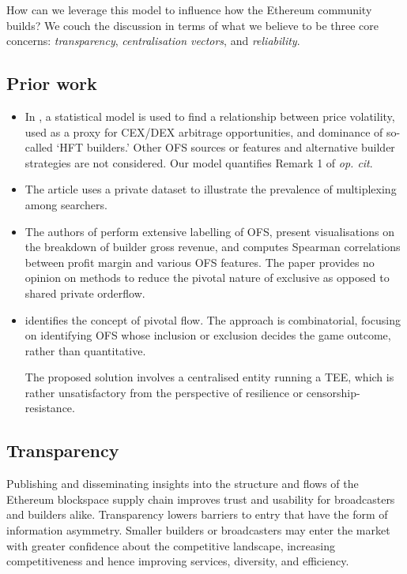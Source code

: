 How can we leverage this model to influence how the Ethereum community builds?
%
We couch the discussion in terms of what we believe to be three core concerns: \emph{transparency}, \emph{centralisation vectors}, and \emph{reliability}.

\subsection*{Prior work}

\begin{itemize}
\item 
  In \cite{gupta2023centralizing}, a statistical model is used to find a relationship between price volatility, used as a proxy for CEX/DEX arbitrage opportunities, and dominance of so-called `HFT builders.'
  Other OFS sources or features and alternative builder strategies are not considered.
  Our model quantifies Remark 1 of \emph{op. cit}.

\item
  The article \cite{titan2023builder} uses a private dataset to illustrate the prevalence of multiplexing among searchers.

\item 
  The authors of \cite{oz2024whoa} perform extensive labelling of OFS, present visualisations on the breakdown of builder gross revenue, and computes Spearman correlations between profit margin and various OFS features.
  The paper provides no opinion on methods to reduce the pivotal nature of exclusive as opposed to shared private orderflow.
  
\item
  \cite{yang2024decentralization} identifies the concept of pivotal flow.
  The approach is combinatorial, focusing on identifying OFS whose inclusion or exclusion decides the game outcome, rather than quantitative.
  
  The proposed solution involves a centralised entity running a TEE, which is rather unsatisfactory from the perspective of resilience or censorship-resistance.
  
\end{itemize}


\subsection*{Transparency}

Publishing and disseminating insights into the structure and flows of the Ethereum blockspace supply chain improves trust and usability for broadcasters and builders alike.
%
Transparency lowers barriers to entry that have the form of information asymmetry. 
%
Smaller builders or broadcasters may enter the market with greater confidence about the competitive landscape, increasing competitiveness and hence improving services, diversity, and efficiency.

